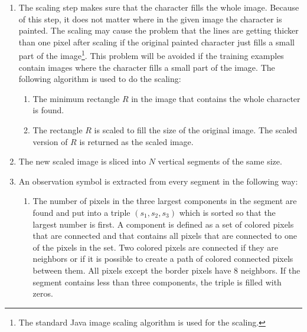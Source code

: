 \begin{enumerate}
  \item The scaling step makes sure that the character fills the whole image. 
  Because of this step, it does not matter where in the given image the character is painted. 
  The scaling may cause the problem that the lines are getting thicker than one pixel after scaling if the original painted character just fills a small part of the image\footnote{The standard Java image scaling algorithm is used for the scaling.}. 
  This problem will be avoided if the training examples contain images where the character fills a small part of the image. 
  The following algorithm is used to do the scaling:
  \begin{enumerate}
    \item The minimum rectangle $R$ in the image that contains the whole character is found.
    \item The rectangle $R$ is scaled to fill the size of the original image. 
    The scaled version of $R$ is returned as the scaled image.
  \end{enumerate}
  \item The new scaled image is sliced into $N$ vertical segments of the same size.
  \item An observation symbol is extracted from every segment in the following way:
  \begin{enumerate}
    \item The number of pixels in the three largest components in the segment are found and put into a triple $(s_{1},s_{2},s_{3})$ which is sorted so that the largest number is first. 
    A component is defined as a set of colored pixels that are connected and that contains all pixels that are connected to one of the pixels in the set. 
    Two colored pixels are connected if they are neighbors or if it is possible to create a path of colored connected pixels between them. 
    All pixels except the border pixels have 8 neighbors. 
    If the segment contains less than three components, the triple is filled with zeros. 
    

\end{enumerate}
\end{enumerate}
